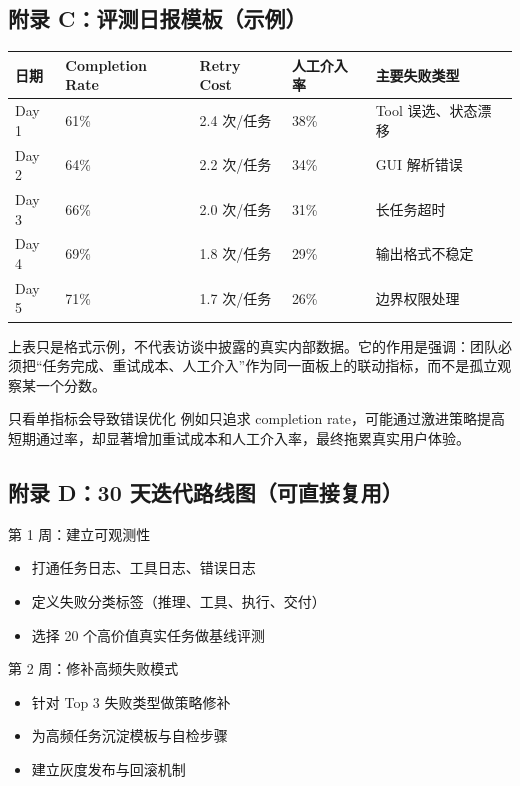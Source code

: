 \subsection{附录 C：评测日报模板（示例）}

\begin{center}
\begin{tabular}{p{2.8cm}p{2.5cm}p{2.5cm}p{2.8cm}p{3.5cm}}
\toprule
日期 & Completion Rate & Retry Cost & 人工介入率 & 主要失败类型 \\
\midrule
Day 1 & 61\% & 2.4 次/任务 & 38\% & Tool 误选、状态漂移 \\
Day 2 & 64\% & 2.2 次/任务 & 34\% & GUI 解析错误 \\
Day 3 & 66\% & 2.0 次/任务 & 31\% & 长任务超时 \\
Day 4 & 69\% & 1.8 次/任务 & 29\% & 输出格式不稳定 \\
Day 5 & 71\% & 1.7 次/任务 & 26\% & 边界权限处理 \\
\bottomrule
\end{tabular}
\end{center}

上表只是格式示例，不代表访谈中披露的真实内部数据。它的作用是强调：团队必须把“任务完成、重试成本、人工介入”作为同一面板上的联动指标，而不是孤立观察某一个分数。

\begin{warningbox}{只看单指标会导致错误优化}
例如只追求 completion rate，可能通过激进策略提高短期通过率，却显著增加重试成本和人工介入率，最终拖累真实用户体验。
\end{warningbox}

\subsection{附录 D：30 天迭代路线图（可直接复用）}

\begin{knowledgebox}{第 1 周：建立可观测性}
\begin{itemize}
    \item 打通任务日志、工具日志、错误日志
    \item 定义失败分类标签（推理、工具、执行、交付）
    \item 选择 20 个高价值真实任务做基线评测
\end{itemize}
\end{knowledgebox}

\begin{knowledgebox}{第 2 周：修补高频失败模式}
\begin{itemize}
    \item 针对 Top 3 失败类型做策略修补
    \item 为高频任务沉淀模板与自检步骤
    \item 建立灰度发布与回滚机制
\end{itemize}
\end{knowledgebox}

